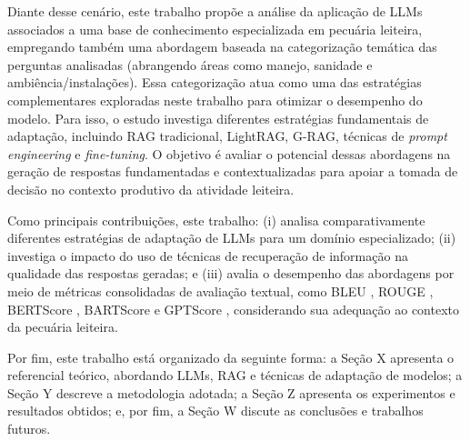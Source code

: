 Diante desse cenário, este trabalho propõe a análise da aplicação de LLMs associados a uma base de conhecimento especializada em pecuária leiteira, empregando também uma abordagem baseada na categorização temática das perguntas analisadas (abrangendo áreas como manejo, sanidade e ambiência/instalações). Essa categorização atua como uma das estratégias complementares exploradas neste trabalho para otimizar o desempenho do modelo. Para isso, o estudo investiga diferentes estratégias fundamentais de adaptação, incluindo RAG tradicional, LightRAG, G-RAG, técnicas de \textit{prompt engineering} e \textit{fine-tuning}. O objetivo é avaliar o potencial dessas abordagens na geração de respostas fundamentadas e contextualizadas para apoiar a tomada de decisão no contexto produtivo da atividade leiteira.

Como principais contribuições, este trabalho: (i) analisa comparativamente diferentes estratégias de adaptação de LLMs para um domínio especializado; (ii) investiga o impacto do uso de técnicas de recuperação de informação na qualidade das respostas geradas; e (iii) avalia o desempenho das abordagens por meio de métricas consolidadas de avaliação textual, como BLEU \cite{papineni-etal-2002-bleu}, ROUGE \cite{lin-2004-rouge}, BERTScore \cite{zhang2020bertscoreevaluatingtextgeneration}, BARTScore \cite{bartscore} e GPTScore \cite{fu2023gptscoreevaluatedesire}, considerando sua adequação ao contexto da pecuária leiteira.

Por fim, este trabalho está organizado da seguinte forma: a Seção X apresenta o referencial teórico, abordando LLMs, RAG e técnicas de adaptação de modelos; a Seção Y descreve a metodologia adotada; a Seção Z apresenta os experimentos e resultados obtidos; e, por fim, a Seção W discute as conclusões e trabalhos futuros.